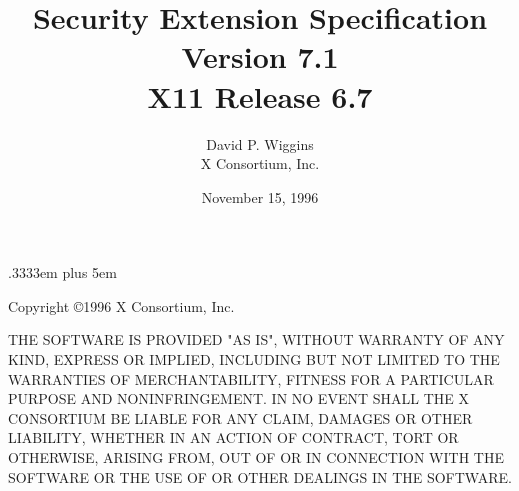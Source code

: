\newenvironment{eerror}[1]{\begin{keeptogether} \encodingsection{#1} \begin{tabbing} \etabstops }{\end{tabbing} \end{keeptogether}}

\newenvironment{etypedef}[1]{\begin{keeptogether} \typename{#1} \begin{tabbing} \etabstops }{\end{tabbing} \end{keeptogether}}

\newcommand{\cfunctionname}[1]{\mbox{\tt #1}}
\newcommand{\cfunctiondecl}[1]{\mbox{\rm #1}}
\newcommand{\cargdecl}[2]{\penalty -1\typename{#1} \argname{#2}}
\newenvironment{cfunction}[2]{\begin{sloppypar}\begin{keeptogether}\vspace{5mm}\typename{#1}\\ \cfunctiondecl{#2}\ (}{)\end{keeptogether}\end{sloppypar}{\hangafter=2 \hangindent=20pt \raggedright\par}}

\spaceskip .3333em plus 5em



\title{Security Extension Specification\\Version 7.1\\X11 Release 6.7}
\author{David P. Wiggins\\X Consortium, Inc.}
\date{November 15, 1996}
\maketitle
\thispagestyle{empty}

\eject

Copyright \copyright 1996 X Consortium, Inc.

THE SOFTWARE IS PROVIDED "AS IS", WITHOUT WARRANTY OF ANY KIND,
EXPRESS OR IMPLIED, INCLUDING BUT NOT LIMITED TO THE WARRANTIES OF
MERCHANTABILITY, FITNESS FOR A PARTICULAR PURPOSE AND NONINFRINGEMENT.
IN NO EVENT SHALL THE X CONSORTIUM BE LIABLE FOR ANY CLAIM, DAMAGES OR
OTHER LIABILITY, WHETHER IN AN ACTION OF CONTRACT, TORT OR OTHERWISE,
ARISING FROM, OUT OF OR IN CONNECTION WITH THE SOFTWARE OR THE USE OF
OR OTHER DEALINGS IN THE SOFTWARE.

